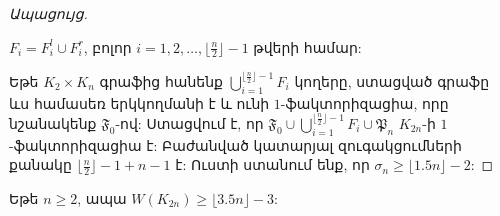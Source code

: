 \begin{hide}
\begin{proof}[Ապացույց]
\begin{center}
$F_i = F^l_i \cup F^r_i$, բոլոր $i=1,2,\ldots,\lfloor\frac{n}{2}\rfloor - 1$ թվերի համար:
\end{center}

Եթե $K_2 \times K_n$ գրաֆից հանենք $\bigcup\limits_{i=1}^{\lfloor\frac{n}{2}\rfloor-1}F_i$ կողերը, ստացված գրաֆը ևս համասեռ երկկողմանի է և ունի $1$-ֆակտորիզացիա, որը նշանակենք $\mathfrak{F}_0$-ով: Ստացվում է, որ $\mathfrak{F}_0 \cup \bigcup\limits_{i=1}^{\lfloor\frac{n}{2}\rfloor-1}F_i \cup \mathfrak{P}_n$ $K_{2n}$-ի $1$-ֆակտորիզացիա է: Բաժանված կատարյալ զուգակցումների քանակը $\lfloor\frac{n}{2}\rfloor - 1 + n - 1$ է: Ուստի ստանում ենք, որ $\sigma_n \geq \lfloor 1.5n \rfloor - 2$:
\end{proof}
\end{hide}

\begin{theorem}
\label{t35n3}
Եթե $n \geq 2$, ապա $W(K_{2n}) \geq \lfloor 3.5n \rfloor - 3$:
\end{theorem}


